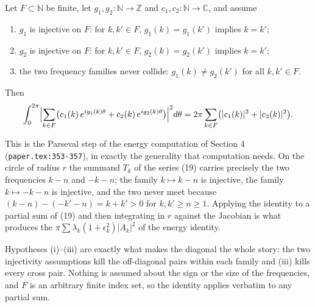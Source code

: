 \begin{helper}
Let $F\subset\mathbb{N}$ be finite, let $g_1,g_2\colon\mathbb{N}\to\mathbb{Z}$
and $c_1,c_2\colon\mathbb{N}\to\mathbb{C}$, and assume
\begin{enumerate}
\item[(i)] $g_1$ is injective on $F$: for $k,k'\in F$, $g_1(k)=g_1(k')$ implies
  $k=k'$;
\item[(ii)] $g_2$ is injective on $F$: for $k,k'\in F$, $g_2(k)=g_2(k')$
  implies $k=k'$;
\item[(iii)] the two frequency families never collide: $g_1(k)\neq g_2(k')$ for
  all $k,k'\in F$.
\end{enumerate}
Then
\[
  \int_{0}^{2\pi}\Bigl|\sum_{k\in F}\bigl(c_1(k)\,e^{i g_1(k)\theta}
      +c_2(k)\,e^{i g_2(k)\theta}\bigr)\Bigr|^{2}d\theta
  =2\pi\sum_{k\in F}\bigl(|c_1(k)|^{2}+|c_2(k)|^{2}\bigr).
\]

This is the Parseval step of the energy computation of Section 4
(\texttt{paper.tex:353-357}), in exactly the generality that computation needs.
On the circle of radius $r$ the summand $T_k$ of the series (19) carries
precisely the two frequencies $k-n$ and $-k-n$; the family $k\mapsto k-n$ is
injective, the family $k\mapsto-k-n$ is injective, and the two never meet
because $(k-n)-(-k'-n)=k+k'>0$ for $k,k'\ge n\ge1$.  Applying the identity to
a partial sum of (19) and then integrating in $r$ against the Jacobian is what
produces the $\pi\sum\lambda_k(1+\epsilon_k^{2})|A_k|^{2}$ of the energy
identity.

Hypotheses (i)--(iii) are exactly what makes the diagonal the whole story: the
two injectivity assumptions kill the off-diagonal pairs within each family and
(iii) kills every cross pair.  Nothing is assumed about the sign or the size of
the frequencies, and $F$ is an arbitrary finite index set, so the identity
applies verbatim to any partial sum.
\end{helper}
